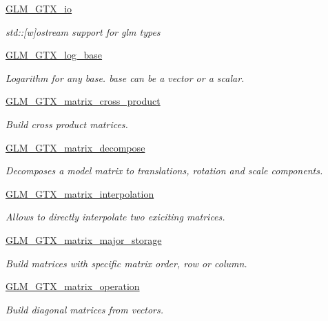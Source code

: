 \begin{DoxyCompactItemize}
\mbox{\hyperlink{group__gtx__io}{G\+L\+M\+\_\+\+G\+T\+X\+\_\+io}}
\begin{DoxyCompactList}\small\item\em std\+:\+:\mbox{[}w\mbox{]}ostream support for glm types \end{DoxyCompactList}\item 
\mbox{\hyperlink{group__gtx__log__base}{G\+L\+M\+\_\+\+G\+T\+X\+\_\+log\+\_\+base}}
\begin{DoxyCompactList}\small\item\em Logarithm for any base. base can be a vector or a scalar. \end{DoxyCompactList}\item 
\mbox{\hyperlink{group__gtx__matrix__cross__product}{G\+L\+M\+\_\+\+G\+T\+X\+\_\+matrix\+\_\+cross\+\_\+product}}
\begin{DoxyCompactList}\small\item\em Build cross product matrices. \end{DoxyCompactList}\item 
\mbox{\hyperlink{group__gtx__matrix__decompose}{G\+L\+M\+\_\+\+G\+T\+X\+\_\+matrix\+\_\+decompose}}
\begin{DoxyCompactList}\small\item\em Decomposes a model matrix to translations, rotation and scale components. \end{DoxyCompactList}\item 
\mbox{\hyperlink{group__gtx__matrix__interpolation}{G\+L\+M\+\_\+\+G\+T\+X\+\_\+matrix\+\_\+interpolation}}
\begin{DoxyCompactList}\small\item\em Allows to directly interpolate two exiciting matrices. \end{DoxyCompactList}\item 
\mbox{\hyperlink{group__gtx__matrix__major__storage}{G\+L\+M\+\_\+\+G\+T\+X\+\_\+matrix\+\_\+major\+\_\+storage}}
\begin{DoxyCompactList}\small\item\em Build matrices with specific matrix order, row or column. \end{DoxyCompactList}\item 
\mbox{\hyperlink{group__gtx__matrix__operation}{G\+L\+M\+\_\+\+G\+T\+X\+\_\+matrix\+\_\+operation}}
\begin{DoxyCompactList}\small\item\em Build diagonal matrices from vectors. \end{DoxyCompactList}\item 

\end{DoxyCompactItemize}
